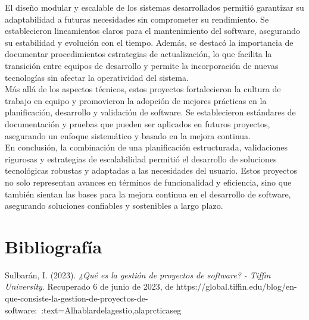 \documentclass[12pt,letterpaper,spanish, xcolor=table]{report}
\numberwithin{figure}{subsection}
\begin{document}
	El diseño modular y escalable de los sistemas desarrollados permitió garantizar su adaptabilidad a futuras necesidades sin comprometer su rendimiento. Se establecieron lineamientos claros para el mantenimiento del software, asegurando su estabilidad y evolución con el tiempo. 
	Además, se destacó la importancia de documentar procedimientos estrategias de actualización, lo que facilita la transición entre equipos de desarrollo y permite la incorporación de nuevas tecnologías sin afectar la operatividad del sistema.\\
	
	 Más allá de los aspectos técnicos, estos proyectos fortalecieron la cultura de trabajo en equipo y promovieron la adopción de mejores prácticas en la planificación, desarrollo y validación de software. Se establecieron estándares de documentación y pruebas que pueden ser aplicados en futuros proyectos, asegurando un enfoque sistemático y basado en la mejora continua.\\
	 
	 En conclusión, la combinación de una planificación estructurada, validaciones rigurosas y estrategias de escalabilidad permitió el desarrollo de soluciones tecnológicas robustas y adaptadas a las necesidades del usuario. Estos proyectos no solo representan avances en 
	 términos de funcionalidad y eficiencia, sino que también sientan las bases para la mejora continua en el desarrollo de software, asegurando soluciones confiables y sostenibles a largo plazo.

	

\newpage
\appendix
	
%

	
	




\newpage
\chapter{Bibliografía}

	Sulbarán, I. (2023). \textit{¿Qué es la gestión de proyectos de software? - Tiffin University}. Recuperado 6 de junio de 2023, de https://global.tiffin.edu/blog/en-que-consiste-la-gestion-de-proyectos-de-software:~:text=Alhablardelagestio,alaprcticaseg\\
	
\end{document}
